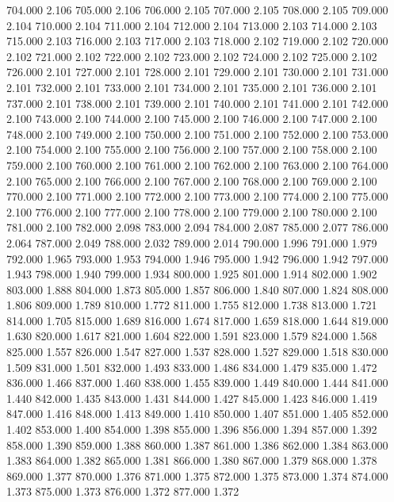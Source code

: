 704.000 2.106 
705.000 2.106 
706.000 2.105 
707.000 2.105 
708.000 2.105 
709.000 2.104 
710.000 2.104 
711.000 2.104 
712.000 2.104 
713.000 2.103 
714.000 2.103 
715.000 2.103 
716.000 2.103 
717.000 2.103 
718.000 2.102 
719.000 2.102 
720.000 2.102 
721.000 2.102 
722.000 2.102 
723.000 2.102 
724.000 2.102 
725.000 2.102 
726.000 2.101 
727.000 2.101 
728.000 2.101 
729.000 2.101 
730.000 2.101 
731.000 2.101 
732.000 2.101 
733.000 2.101 
734.000 2.101 
735.000 2.101 
736.000 2.101 
737.000 2.101 
738.000 2.101 
739.000 2.101 
740.000 2.101 
741.000 2.101 
742.000 2.100 
743.000 2.100 
744.000 2.100 
745.000 2.100 
746.000 2.100 
747.000 2.100 
748.000 2.100 
749.000 2.100 
750.000 2.100 
751.000 2.100 
752.000 2.100 
753.000 2.100 
754.000 2.100 
755.000 2.100 
756.000 2.100 
757.000 2.100 
758.000 2.100 
759.000 2.100 
760.000 2.100 
761.000 2.100 
762.000 2.100 
763.000 2.100 
764.000 2.100 
765.000 2.100 
766.000 2.100 
767.000 2.100 
768.000 2.100 
769.000 2.100 
770.000 2.100 
771.000 2.100 
772.000 2.100 
773.000 2.100 
774.000 2.100 
775.000 2.100 
776.000 2.100 
777.000 2.100 
778.000 2.100 
779.000 2.100 
780.000 2.100 
781.000 2.100 
782.000 2.098 
783.000 2.094 
784.000 2.087 
785.000 2.077 
786.000 2.064 
787.000 2.049 
788.000 2.032 
789.000 2.014 
790.000 1.996 
791.000 1.979 
792.000 1.965 
793.000 1.953 
794.000 1.946 
795.000 1.942 
796.000 1.942 
797.000 1.943 
798.000 1.940 
799.000 1.934 
800.000 1.925 
801.000 1.914 
802.000 1.902 
803.000 1.888 
804.000 1.873 
805.000 1.857 
806.000 1.840 
807.000 1.824 
808.000 1.806 
809.000 1.789 
810.000 1.772 
811.000 1.755 
812.000 1.738 
813.000 1.721 
814.000 1.705 
815.000 1.689 
816.000 1.674 
817.000 1.659 
818.000 1.644 
819.000 1.630 
820.000 1.617 
821.000 1.604 
822.000 1.591 
823.000 1.579 
824.000 1.568 
825.000 1.557 
826.000 1.547 
827.000 1.537 
828.000 1.527 
829.000 1.518 
830.000 1.509 
831.000 1.501 
832.000 1.493 
833.000 1.486 
834.000 1.479 
835.000 1.472 
836.000 1.466 
837.000 1.460 
838.000 1.455 
839.000 1.449 
840.000 1.444 
841.000 1.440 
842.000 1.435 
843.000 1.431 
844.000 1.427 
845.000 1.423 
846.000 1.419 
847.000 1.416 
848.000 1.413 
849.000 1.410 
850.000 1.407 
851.000 1.405 
852.000 1.402 
853.000 1.400 
854.000 1.398 
855.000 1.396 
856.000 1.394 
857.000 1.392 
858.000 1.390 
859.000 1.388 
860.000 1.387 
861.000 1.386 
862.000 1.384 
863.000 1.383 
864.000 1.382 
865.000 1.381 
866.000 1.380 
867.000 1.379 
868.000 1.378 
869.000 1.377 
870.000 1.376 
871.000 1.375 
872.000 1.375 
873.000 1.374 
874.000 1.373 
875.000 1.373 
876.000 1.372 
877.000 1.372 
